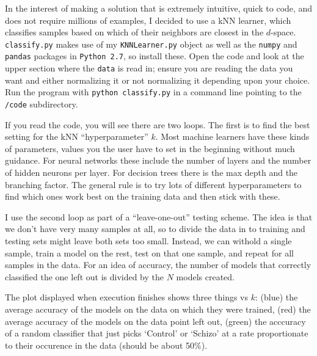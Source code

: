 \documentclass[]{article}
\begin{document}
  In the interest of making a solution that is extremely intuitive, quick to code, and does not require millions of examples, I decided to use a kNN learner, which classifies samples based on which of their neighbors are closest in the $d$-space. \texttt{classify.py} makes use of my \texttt{KNNLearner.py} object as well as the \texttt{numpy} and \texttt{pandas} packages in \texttt{Python 2.7}, so install these. Open the code and look at the upper section where the \texttt{data} is read in; ensure you are reading the data you want and either normalizing it or not normalizing it depending upon your choice. Run the program with \texttt{python classify.py} in a command line pointing to the \texttt{/code} subdirectory.

  If you read the code, you will see there are two loops. The first is to find the best setting for the kNN ``hyperparameter'' $k$. Most machine learners have these kinds of parameters, values you the user have to set in the beginning without much guidance. For neural networks these include the number of layers and the number of hidden neurons per layer. For decision trees there is the max depth and the branching factor. The general rule is to try lots of different hyperparameters to find which ones work best on the training data and then stick with these.

  I use the second loop as part of a ``leave-one-out'' testing scheme. The idea is that we don't have very many samples at all, so to divide the data in to training and testing sets might leave both sets too small. Instead, we can withold a single sample, train a model on the rest, test on that one sample, and repeat for all samples in the data. For an idea of accuracy, the number of models that correctly classified the one left out is divided by the $N$ models created.

  The plot displayed when execution finishes shows three things vs $k$: (blue) the average accuracy of the models on the data on which they were trained, (red) the average accuracy of the models on the data point left out, (green) the acccuracy of a random classifier that just picks `Control' or `Schizo' at a rate proportionate to their occurence in the data (should be about 50\%).
\end{document}
